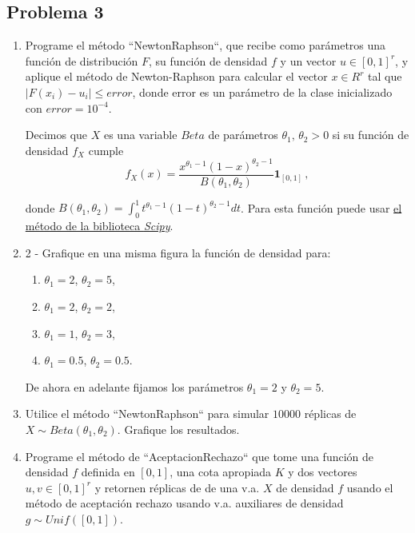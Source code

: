 \subsection*{Problema 3}
\begin{enumerate}
    \item Programe el método ``NewtonRaphson``, que recibe como parámetros una función de distribución $F$, su función de densidad $f$ y un vector $u \in [0, 1]^r$, y aplique el método de Newton-Raphson para calcular el vector $x \in R^r$ tal que $|F(x_i) − u_i|\leq error$, donde error es un parámetro de la clase inicializado con $error=10^{−4}$.
    
    Decimos que $X$ es una variable $Beta$ de parámetros $\theta_1,\,\theta_2>0$ si su función de densidad $f_X$ cumple
    $$ f_X(x) = \frac{x^{\theta_1-1}(1-x)^{\theta_2-1}}{B(\theta_1,\theta_2)}\mathbf{1}_{[0,1]} \, ,$$

    donde $B(\theta_1,\theta_2) = \displaystyle\int^1_0 t^{\theta_1-1}(1-t)^{\theta_2-1}dt$. Para esta función puede usar \href{https://docs.scipy.org/doc/scipy/reference/generated/scipy.special.beta.html}{el método de la biblioteca \textit{Scipy}}.
    
    \item 2 - Grafique en una misma figura la función de densidad para:
    \begin{enumerate}
        \item $\theta_1 = 2$, $\theta_2 = 5$,
        \item $\theta_1 = 2$, $\theta_2 = 2$,
        \item $\theta_1 = 1$, $\theta_2 = 3$,
        \item $\theta_1 = 0.5$, $\theta_2 = 0.5$.
    \end{enumerate}
    
    De ahora en adelante fijamos los parámetros $\theta_1=2$ y $\theta_2=5$.

    \item Utilice el método ``NewtonRaphson`` para simular $10000$ réplicas de $X\sim Beta(\theta_1,\theta_2)$. Grafique los resultados.
    
    \item Programe el método de ``AceptacionRechazo`` que tome una función de densidad $f$ definida en $[0,1]$, una cota apropiada $K$ y dos vectores $u,v\in[0,1]^r$ y retornen réplicas de de una v.a. $X$ de densidad $f$ usando el método de aceptación rechazo usando v.a. auxiliares de densidad $g\sim Unif([0,1])$.
    

\end{enumerate}
